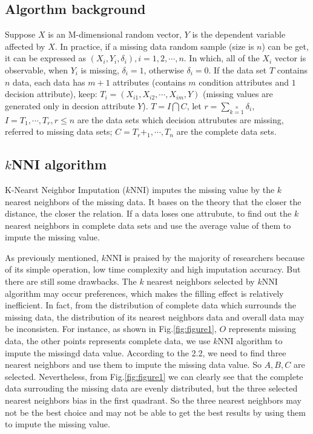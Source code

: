 \documentclass[print]{jicspack}
\begin{document}
\subsection{Algorthm background}
Suppose $X$ is an M-dimensional random vector, $Y$ is the dependent variable affected by $X$. In practice, if a missing data random sample (size is $n$) can be get, it can be expressed as $(X_i, Y_i, \delta_i), i= 1, 2,\cdots, n$. In which, all of the $X_i$ vector is observable, when $Y_i$ is missing, $\delta_i = 1$, otherwise $\delta_i = 0$. If the data set $T$ contains $n$ data, each data has $m + 1$ attributes (contains $m$ condition attributes and $1$ decision attribute), keep: $T_i = (X_{i1}, X_{i2}, \cdots, X_{im}, Y)$ (missing values are generated only in decsion attribute $Y$). $T = I \bigcap C$, let $r = \sum\limits_{k=1}\limits^{n} \delta_i$, $I = {T_1, \cdots, T_r}, r \leq n$ are the data sets which decision attrubutes are missing, referred to missing data sets; $C = {T_r+_1, \cdots, T_n}$ are the complete data sets.
\subsection{$k$NNI algorithm}
\label{2.2}
K-Nearst Neighbor Imputation ($k$NNI) imputes the missing value by the $k$ nearest neighbors of the missing data. It bases on the theory that the closer the distance, the closer the relation. If a data loses one attrubute, to find out the $k$ nearest neighbors in complete data sets and use the average value of them to impute the missing value.

As previously mentioned, $k$NNI is praised by the majority of researchers because of its simple operation, low time complexity and high imputation accuracy. But there are still some drawbacks. The $k$ nearest neighbors selected by $k$NNI algorithm may occur preferences, which makes the filling effect is relatively inefficient. In fact, from the distribution of complete data which surrounds the missing data, the distribution of its nearest neighbors data and overall data may be inconsisten. For instance, as shown in Fig.\ref{fig:figure1}, $O$ represents missing data, the other points represents complete data, we use $k$NNI algorithm to impute the missingd data value. According to the 2.2, we need to find three nearest neighbors and use them to impute the missing data value. So $A, B, C$ are selected. Nevertheless, from Fig.\ref{fig:figure1} we can clearly see that the complete data surrouding the missing data are evenly distributed, but the three selected nearest neighbors bias in the first quadrant. So the three nearest neighbors may not be the best choice and may not be able to get the best results by using them to impute the missing value.
\end{document}
